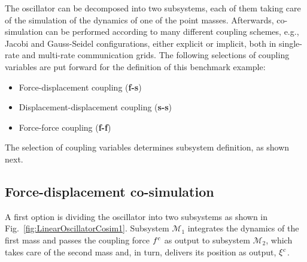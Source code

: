 \documentclass[fleqn,11pt]{article}
\begin{document}
The oscillator can be decomposed into two subsystems, each of them taking care of the simulation of the dynamics of one of the point masses.
Afterwards, co-simulation can be performed according to many different coupling schemes, e.g., 
Jacobi and Gauss-Seidel configurations, either explicit or implicit, both in single-rate and multi-rate communication grids.
The following selections of coupling variables are put forward for the definition of this benchmark example:
\begin{itemize}
	\item{Force-displacement coupling (\textbf{f-s})} 
	\item{Displacement-displacement coupling (\textbf{s-s}) }
	\item{Force-force coupling (\textbf{f-f}) }
\end{itemize}
%
The selection of coupling variables determines subsystem definition, as shown next.

\subsection{Force-displacement co-simulation}
\label{ForceDisplacement}

A first option is dividing the oscillator into two subsystems as shown in Fig.~\ref{fig:LinearOscillatorCosim1}.
Subsystem $\mathcal{M}_1$ integrates the dynamics of the first mass and passes the coupling force $f^{\rm c}$ as output to subsystem $\mathcal{M}_2$, which takes care of the second mass and, in turn, delivers its position as output, $\xi^{\rm c}$.
\end{document}
